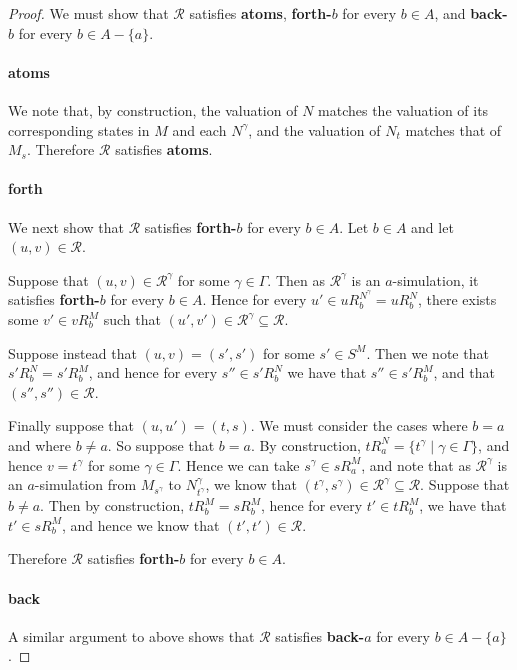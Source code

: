 \begin{proof}
We must show that $\mathcal{R}$ satisfies {\bf atoms}, {\bf forth-$b$} for every
$b \in A$, and {\bf back-$b$} for every $b \in A - \{a\}$.

\paragraph{atoms} We note that, by construction, the valuation of $N$ matches
the valuation of its corresponding states in $M$ and each $N^\gamma$, and the
valuation of $N_t$ matches that of $M_s$. Therefore $\mathcal{R}$ satisfies {\bf
atoms}.

\paragraph{forth} We next show that $\mathcal{R}$ satisfies {\bf forth-$b$} for
every $b \in A$.  Let $b \in A$ and let $(u, v) \in \mathcal{R}$.

Suppose that $(u, v) \in \mathcal{R}^\gamma$ for some $\gamma \in \Gamma$.  Then
as $\mathcal{R}^\gamma$ is an $a$-simulation, it satisfies {\bf forth-$b$} for
every $b \in A$. Hence for every $u' \in uR^{N^\gamma}_b = uR^N_b$, there exists
some $v' \in vR^M_b$ such that $(u', v') \in \mathcal{R}^\gamma \subseteq
\mathcal{R}$. 

Suppose instead that $(u, v) = (s', s')$ for some $s' \in S^M$.  Then we note
that $s'R^N_b = s'R^M_b$, and hence for every $s'' \in s'R^N_b$ we have that
$s'' \in s'R^M_b$, and that $(s'', s'') \in \mathcal{R}$. 

Finally suppose that $(u, u') = (t, s)$. We must consider the cases where $b =
a$ and where $b \neq a$. So suppose that $b = a$. By construction, $tR^N_a =
\{t^\gamma \mid \gamma \in \Gamma\}$, and hence $v = t^\gamma$ for some $\gamma
\in \Gamma$. Hence we can take $s^\gamma \in sR^M_a$, and note that as
$\mathcal{R}^\gamma$ is an $a$-simulation from $M_{s^\gamma}$ to
$N^\gamma_{t^\gamma}$, we know that $(t^\gamma, s^\gamma) \in \mathcal{R}^\gamma
\subseteq \mathcal{R}$. Suppose that $b \neq a$. Then by construction, $tR^M_b =
sR^M_b$, hence for every $t' \in tR^M_b$, we have that $t' \in sR^M_b$, and
hence we know that $(t', t') \in \mathcal{R}$. 

Therefore $\mathcal{R}$ satisfies {\bf forth-$b$} for every $b \in A$.

\paragraph{back} A similar argument to above shows that $\mathcal{R}$
satisfies {\bf back-$a$} for every $b \in A - \{a\}$.


\end{proof}
